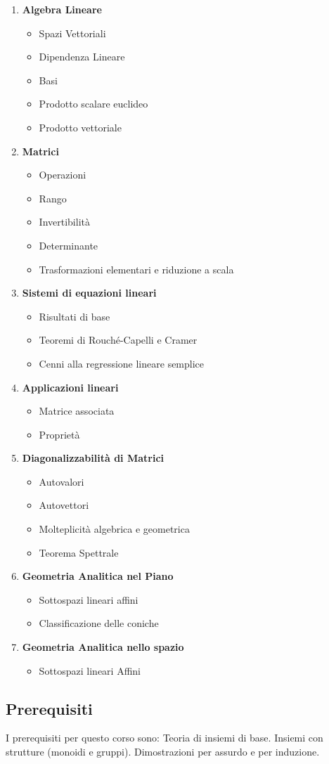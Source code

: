 \begin{enumerate}
	\item \textbf{Algebra Lineare}
	\begin{itemize}
		\item Spazi Vettoriali
		\item Dipendenza Lineare
		\item Basi
		\item Prodotto scalare euclideo
		\item Prodotto vettoriale
	\end{itemize}
	\item \textbf{Matrici}
	\begin{itemize}	
		\item Operazioni
		\item Rango
		\item Invertibilità
		\item Determinante
		\item Trasformazioni elementari e riduzione a scala 
	\end{itemize}
	\item \textbf{Sistemi di equazioni lineari}
	\begin{itemize}
		\item Risultati di base
		\item Teoremi di Rouché-Capelli e Cramer
		\item Cenni alla regressione lineare semplice
	\end{itemize}
	\item \textbf{Applicazioni lineari}
	\begin{itemize}
		\item Matrice associata
		\item Proprietà
	\end{itemize}
	\item \textbf{Diagonalizzabilità di Matrici}
	\begin{itemize}
		\item Autovalori
		\item Autovettori
		\item Molteplicità algebrica e geometrica
		\item Teorema Spettrale
	\end{itemize}
	\item \textbf{Geometria Analitica nel Piano}
	\begin{itemize}
		\item Sottospazi lineari affini
		\item Classificazione delle coniche
	\end{itemize}
	\item \textbf{Geometria Analitica nello spazio}
	\begin{itemize}
		\item Sottospazi lineari Affini
	\end{itemize}
	
\end{enumerate}

\subsection*{Prerequisiti}
I prerequisiti per questo corso sono:
Teoria di insiemi di base. Insiemi con strutture (monoidi e gruppi). Dimostrazioni per assurdo e per induzione.